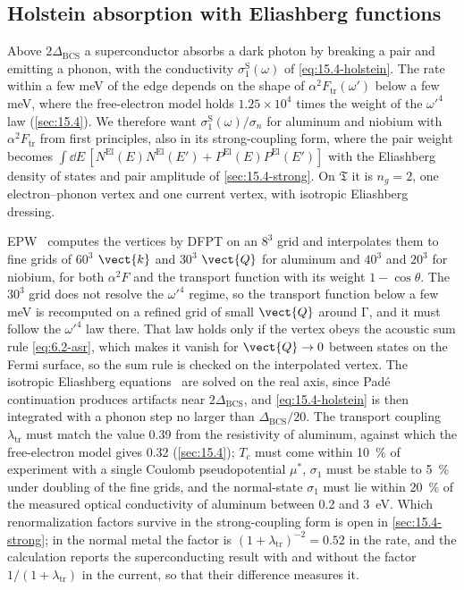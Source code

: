 \subsection{Holstein absorption with Eliashberg functions}

Above $2\Delta_{\mathrm{BCS}}$ a superconductor absorbs a dark photon by breaking a pair and emitting a phonon, with the conductivity $\sigma_1^{\mathrm{S}}(\omega)$ of \cref{eq:15.4-holstein}. The rate within a few meV of the edge depends on the shape of $\alpha^2F_{\mathrm{tr}}(\omega')$ below a few meV, where the free-electron model holds $1.25\times10^4$ times the weight of the $\omega'^4$ law (\cref{sec:15.4}). We therefore want $\sigma_1^{\mathrm{S}}(\omega)/\sigma_n$ for aluminum and niobium with $\alpha^2F_{\mathrm{tr}}$ from first principles, also in its strong-coupling form, where the pair weight becomes $\int\dd E\,[N^{\mathrm{El}}(E)N^{\mathrm{El}}(E') + P^{\mathrm{El}}(E)P^{\mathrm{El}}(E')]$ with the Eliashberg density of states and pair amplitude of \cref{sec:15.4-strong}. On $\mathfrak{T}$ it is $n_g = 2$, one electron--phonon vertex and one current vertex, with isotropic Eliashberg dressing.

EPW~\cite{ponce2016epw} computes the vertices by DFPT on an $8^3$ grid and interpolates them to fine grids of $60^3$ $\vect{k}$ and $30^3$ $\vect{Q}$ for aluminum and $40^3$ and $20^3$ for niobium, for both $\alpha^2F$ and the transport function with its weight $1 - \cos\theta$. The $30^3$ grid does not resolve the $\omega'^4$ regime, so the transport function below a few meV is recomputed on a refined grid of small $\vect{Q}$ around $\mathrm{\Gamma}$, and it must follow the $\omega'^4$ law there. That law holds only if the vertex obeys the acoustic sum rule \cref{eq:6.2-asr}, which makes it vanish for $\vect{Q}\to0$ between states on the Fermi surface, so the sum rule is checked on the interpolated vertex. The isotropic Eliashberg equations~\cite{margine2013anisotropic} are solved on the real axis, since Pad\'e continuation produces artifacts near $2\Delta_{\mathrm{BCS}}$, and \cref{eq:15.4-holstein} is then integrated with a phonon step no larger than $\Delta_{\mathrm{BCS}}/20$. The transport coupling $\lambda_{\mathrm{tr}}$ must match the value 0.39 from the resistivity of aluminum, against which the free-electron model gives 0.32 (\cref{sec:15.4}); $T_c$ must come within \SI{10}{\percent} of experiment with a single Coulomb pseudopotential $\mu^*$, $\sigma_1$ must be stable to \SI{5}{\percent} under doubling of the fine grids, and the normal-state $\sigma_1$ must lie within \SI{20}{\percent} of the measured optical conductivity of aluminum between 0.2 and \SI{3}{eV}. Which renormalization factors survive in the strong-coupling form is open in \cref{sec:15.4-strong}; in the normal metal the factor is $(1 + \lambda_{\mathrm{tr}})^{-2} = 0.52$ in the rate, and the calculation reports the superconducting result with and without the factor $1/(1 + \lambda_{\mathrm{tr}})$ in the current, so that their difference measures it.

